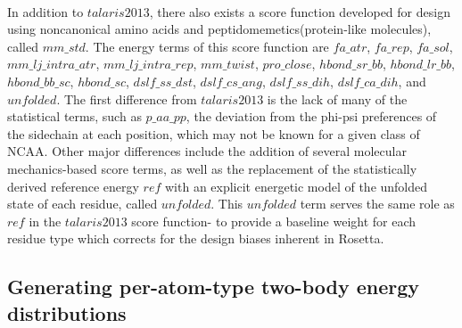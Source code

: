 \paragraph{}
In addition to $talaris2013$, there also exists a score function developed for design using noncanonical amino acids and peptidomemetics(protein-like molecules), called $mm\_std$\cite{renfrew_incorporation_2012}.
The energy terms of this score function are $fa\_atr$, $fa\_rep$, $fa\_sol$, $mm\_lj\_intra\_atr$, $mm\_lj\_intra\_rep$, $mm\_twist$, $pro\_close$, $hbond\_sr\_bb$, $hbond\_lr\_bb$, $hbond\_bb\_sc$, $hbond\_sc$, $dslf\_ss\_dst$, $dslf\_cs\_ang$, $dslf\_ss\_dih$, $dslf\_ca\_dih$, and $unfolded$.
The first difference from $talaris2013$ is the lack of many of the statistical terms, such as $p\_aa\_pp$, the deviation from the phi-psi preferences of the sidechain at each position, which may not be known for a given class of NCAA.
Other major differences include the addition of several molecular mechanics-based score terms, as well as the replacement of the statistically derived reference energy $ref$ with an explicit energetic model of the unfolded state of each residue, called $unfolded$.
This $unfolded$ term serves the same role as $ref$ in the $talaris2013$ score function- to provide a baseline weight for each residue type which corrects for the design biases inherent in Rosetta.


\subsection{Generating per-atom-type two-body energy distributions}
